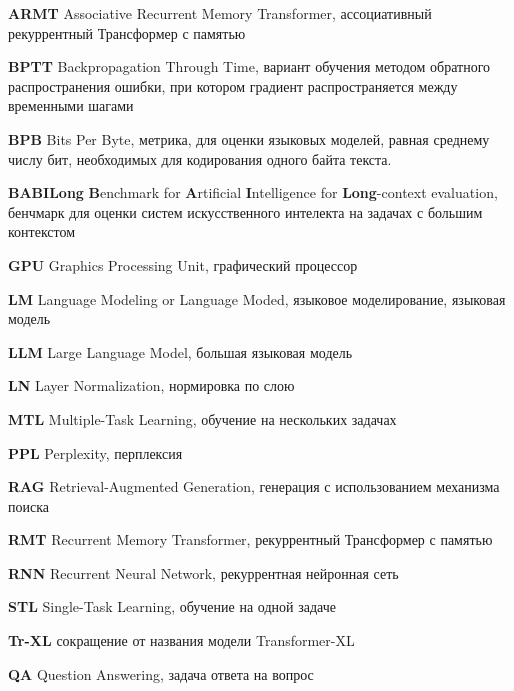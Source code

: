 \printnomenclature[3.5cm] %

\textbf{ARMT} Associative Recurrent Memory Transformer, ассоциативный рекуррентный Трансформер с памятью

\textbf{BPTT} Backpropagation Through Time, вариант обучения методом обратного распространения ошибки, при котором градиент распространяется между временными шагами

\textbf{BPB} Bits Per Byte, метрика, для оценки языковых моделей, равная среднему числу бит, необходимых для кодирования одного байта текста.

\textbf{BABILong} \textbf{B}enchmark for \textbf{A}rtificial \textbf{I}ntelligence for \textbf{Long}-context evaluation, бенчмарк для оценки систем искусственного интелекта на задачах с большим контекстом

\textbf{GPU} Graphics Processing Unit, графический процессор

\textbf{LM} Language Modeling or Language Moded, языковое моделирование, языковая модель

\textbf{LLM} Large Language Model, большая языковая модель

\textbf{LN} Layer Normalization, нормировка по слою 

\textbf{MTL} Multiple-Task Learning, обучение на нескольких задачах

\textbf{PPL} Perplexity, перплексия

\textbf{RAG} Retrieval-Augmented Generation, генерация с использованием механизма поиска

\textbf{RMT} Recurrent Memory Transformer, рекуррентный Трансформер с памятью

\textbf{RNN} Recurrent Neural Network, рекуррентная нейронная сеть

\textbf{STL} Single-Task Learning, обучение на одной задаче

\textbf{Tr-XL} сокращение от названия модели Transformer-XL 

\textbf{QA} Question Answering, задача ответа на вопрос